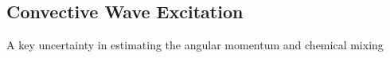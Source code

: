 {\color{purple}
\subsection{Convective Wave Excitation}
}

A key uncertainty in estimating the angular momentum and chemical mixing 
